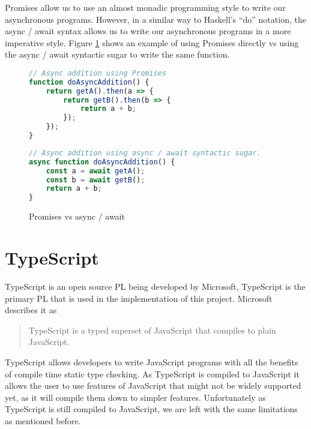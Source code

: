 Promises allow us to use an almost monadic programming style to write our asynchronous programs. However, in a similar way to Haskell's ``do'' notation, the async / await syntax allows us to write our asynchronous programs in a more imperative style. Figure \ref{background:figure:async-await} shows an example of using Promises directly vs using the async / await syntactic sugar to write the same function.

\begin{figure}
    \caption{Promises vs async / await}
    \label{background:figure:async-await}
    \begin{minipage}[t]{0.45\textwidth}
        \begin{lstlisting}[language=javascript]
// Async addition using Promises
function doAsyncAddition() {
    return getA().then(a => {
        return getB().then(b => {
            return a + b;
        });
    });
}
        \end{lstlisting}
    \end{minipage}
    \begin{minipage}[t]{0.45\textwidth}
        \begin{lstlisting}[language=javascript]
// Async addition using async / await syntactic sugar.
async function doAsyncAddition() {
    const a = await getA();
    const b = await getB();
    return a + b;
}
        \end{lstlisting}
    \end{minipage}
\end{figure}

\section{TypeScript}
TypeScript is an open source PL being developed by Microsoft, TypeScript is the primary PL that is used in the implementation of this project. Microsoft describes it as

\begin{quote}
TypeScript is a typed superset of JavaScript that compiles to plain JavaScript.\cite{microsoftts}
\end{quote}

TypeScript allows developers to write JavaScript programs with all the benefits of compile time static type checking. As TypeScript is compiled to JavaScript it allows the user to use features of JavaScript that might not be widely supported yet, as it will compile them down to simpler features. Unfortunately as TypeScript is still compiled to JavaScript, we are left with the same limitations as mentioned before.

